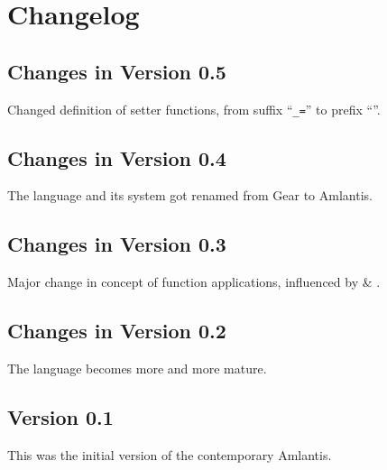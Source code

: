 
\chapter{Changelog}
\label{sec:changelog}

\section*{Changes in Version 0.5}

Changed definition of setter functions, from suffix ``\lstinline!_=!'' to prefix ``''. 

\section*{Changes in Version 0.4}

The language and its system got renamed from Gear to Amlantis. 

\section*{Changes in Version 0.3}

Major change in concept of function applications, influenced by  \& . 

\section*{Changes in Version 0.2}

The language becomes more and more mature.

\section*{Version 0.1}

This was the initial version of the contemporary Amlantis. 
